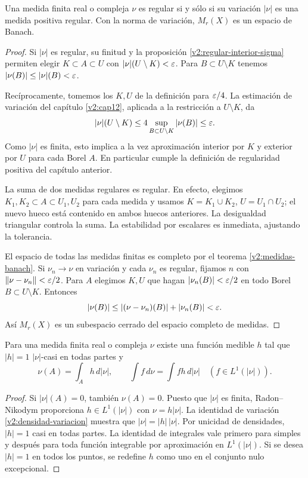 \begin{proposicion}\label{v2:medidas-regulares-banach}
Una medida finita real o compleja $\nu$ es regular si y sólo si su variación $|\nu|$ es una medida positiva regular. Con la norma de variación, $M_r(X)$ es un espacio de Banach.
\end{proposicion}
\begin{proof}
Si $|\nu|$ es regular, su finitud y la proposición \ref{v2:regular-interior-sigma} permiten elegir $K\subset A\subset U$ con $|\nu|(U\setminus K)<\varepsilon$. Para $B\subset U\setminus K$ tenemos $|\nu(B)|\le |\nu|(B)<\varepsilon$.

Recíprocamente, tomemos los $K,U$ de la definición para $\varepsilon/4$. La estimación de variación del capítulo \ref{v2:cap12}, aplicada a la restricción a $U\setminus K$, da
\[
 |\nu|(U\setminus K)\le 4\sup_{B\subset U\setminus K}|\nu(B)|\le\varepsilon.
\]
Como $|\nu|$ es finita, esto implica a la vez aproximación interior por $K$ y exterior por $U$ para cada Borel $A$. En particular cumple la definición de regularidad positiva del capítulo anterior.

La suma de dos medidas regulares es regular. En efecto, elegimos $K_1,K_2\subset A\subset U_1,U_2$ para cada medida y usamos $K=K_1\cup K_2$, $U=U_1\cap U_2$; el nuevo hueco está contenido en ambos huecos anteriores. La desigualdad triangular controla la suma. La estabilidad por escalares es inmediata, ajustando la tolerancia.

El espacio de todas las medidas finitas es completo por el teorema \ref{v2:medidas-banach}. Si $\nu_n\to\nu$ en variación y cada $\nu_n$ es regular, fijamos $n$ con $\left\lVert\nu-\nu_n\right\rVert<\varepsilon/2$. Para $A$ elegimos $K,U$ que hagan $|\nu_n(B)|<\varepsilon/2$ en todo Borel $B\subset U\setminus K$. Entonces
\[
 |\nu(B)|\le |(\nu-\nu_n)(B)|+|\nu_n(B)|<\varepsilon.
\]
Así $M_r(X)$ es un subespacio cerrado del espacio completo de medidas.
\end{proof}

\begin{lema}\label{v2:polar-medida}
Para una medida finita real o compleja $\nu$ existe una función medible $h$ tal que $|h|=1$ $|\nu|$-casi en todas partes y
\[
 \nu(A)=\int_A h\,d|\nu|,\qquad
 \int f\,d\nu=\int fh\,d|\nu|\quad(f\in L^1(|\nu|)).
\]
\end{lema}
\begin{proof}
Si $|\nu|(A)=0$, también $\nu(A)=0$. Puesto que $|\nu|$ es finita, Radon--Nikodym proporciona $h\in L^1(|\nu|)$ con $\nu=h|\nu|$. La identidad de variación \ref{v2:densidad-variacion} muestra que $|\nu|=|h|\,|\nu|$. Por unicidad de densidades, $|h|=1$ casi en todas partes. La identidad de integrales vale primero para simples y después para toda función integrable por aproximación en $L^1(|\nu|)$. Si se desea $|h|=1$ en todos los puntos, se redefine $h$ como uno en el conjunto nulo excepcional.
\end{proof}

